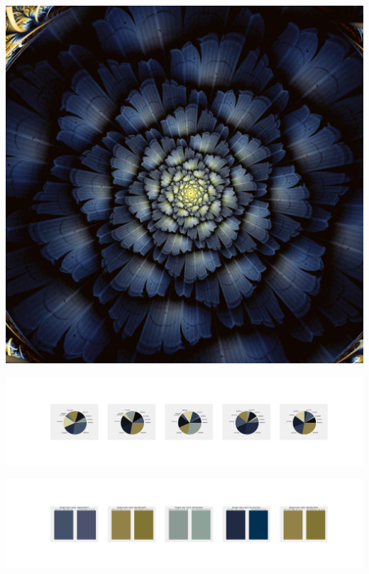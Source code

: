 \documentclass[11pt]{article}
\begin{document}
\begin{landscape}
    \begin{center}
    \includegraphics[width=\textwidth]{./nbimg/file (391).jpg}
    \end{center}

    \begin{center}
    \includegraphics[width=250mm]{./nbimg/pie-324.jpg}
    \end{center}

    \begin{center}
    \includegraphics[width=250mm]{./nbimg/peak-324.jpg}
    \end{center}
    


\end{landscape}
\end{document}
